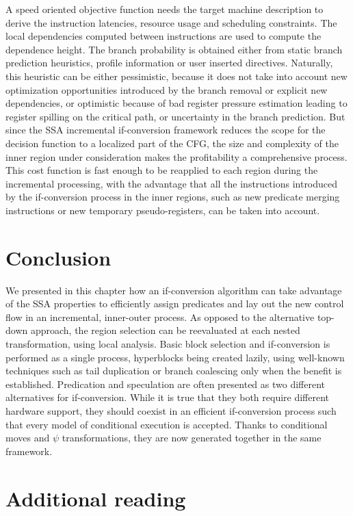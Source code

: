 A speed oriented objective function needs the target machine description to derive the instruction latencies, resource usage and scheduling constraints. 
The local dependencies computed between instructions are used to compute the dependence height. 
The branch probability is obtained either from static branch prediction heuristics, profile information or user inserted directives. 
Naturally, this heuristic can be either pessimistic, because it does not take into account new optimization opportunities introduced by the branch removal or explicit new dependencies, or optimistic because of bad register pressure estimation leading to register spilling on the critical path, or uncertainty in the branch prediction. 
But since the SSA incremental if-conversion framework reduces the scope for the decision function to a localized part of the CFG, the size and complexity of the inner region under consideration makes the profitability a comprehensive process. 
This cost function is fast enough to be reapplied to each region during the incremental processing, with the advantage that all the instructions introduced by the if-conversion process in the inner regions, such as new predicate merging instructions or new temporary pseudo-registers, can be taken into account.

\section{Conclusion} 

We presented in this chapter how an if-conversion algorithm can take advantage of the SSA properties to efficiently assign predicates and lay out the new control flow in an incremental, inner-outer process. 
As opposed to the alternative top-down approach, the region selection can be reevaluated at each nested transformation, using local analysis. 
Basic block selection and if-conversion is performed as a single process, hyperblocks being created lazily, using well-known techniques such as tail duplication or branch coalescing only when the benefit is established. 
Predication and speculation are often presented as two different alternatives for if-conversion. 
While it is true that they both require different hardware support, they should coexist in an efficient if-conversion process such that every model of conditional execution is accepted. 
Thanks to conditional moves and $\psi$ transformations, they are now generated together in the same framework.

\section{Additional reading}

